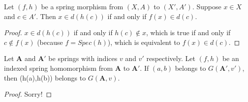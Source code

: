 %

\begin{lemma}
  Let $(f,h)$ be a spring morphism from $(X,A)$ to $(X',A')$. Suppose $x\in{X}$ and $c\in{A'}$.
  Then $x\in{d(h(c))}$ if and only if $f(x)\in{d(c)}$.
\end{lemma}
\begin{proof}
  $x\in{d(h(c))}$ if and only if $h(c)\notin{x}$, which is true if and only if $c\notin{f(x)}$
  (because $f=Spec(h)$), which is equivalent to $f(x)\in{d(c)}$.
\end{proof}

\begin{proposition}
  Let $\boldsymbol{A}$ and $\boldsymbol{A'}$ be springs with indices $v$ and $v'$ respectively. Let
  $(f,h)$ be an indexed spring homomorphism from $\boldsymbol{A}$ to $\boldsymbol{A'}$. If $(a,b)$
  belongs to $G(\boldsymbol{A'},v')$, then (h(a),h(b)) belongs to $G(\boldsymbol{A},v)$.
\end{proposition}
\begin{proof}
  Sorry!
\end{proof}
